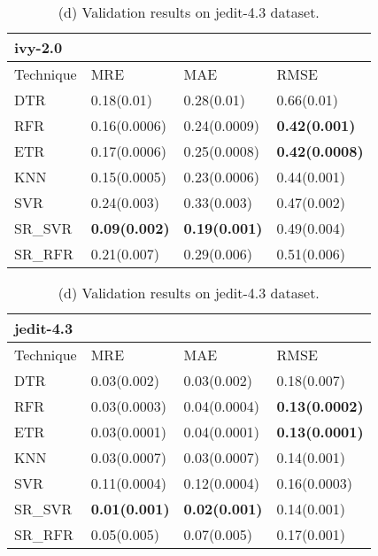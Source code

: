 \documentclass[]{article}
\begin{document}
	\begin{table}[h]
		\captionsetup[subtable]{labelformat=empty}
		\begin{adjustwidth}{-3.4cm}{}
			\begin{subtable}{9.5cm}
				\centering
				\caption{(c) Validation results on ivy-2.0 dataset.}
				\label{tab:ivy-wv}
				\begin{tabular}{llll}
					\hline
					ivy-2.0 &&&\\ \hline
					Technique & MRE & MAE & RMSE\\  \hline
					DTR & 0.18(0.01) & 0.28(0.01) & 0.66(0.01)\\ 
					RFR & 0.16(0.0006) & 0.24(0.0009) & \bfseries 0.42(0.001)\\ 
					ETR & 0.17(0.0006) & 0.25(0.0008) & \bfseries 0.42(0.0008)\\ 
					KNN & 0.15(0.0005) & 0.23(0.0006) & 0.44(0.001)\\ 
					SVR & 0.24(0.003) & 0.33(0.003) & 0.47(0.002)\\ 
					SR\_SVR & \bfseries 0.09(0.002) & \bfseries 0.19(0.001) & 0.49(0.004)\\
					SR\_RFR & 0.21(0.007) & 0.29(0.006) & 0.51(0.006)\\ \hline
				\end{tabular}
			\end{subtable}
			\begin{subtable}{9cm}
				\centering
				\caption{(d) Validation results on jedit-4.3 dataset.}
				\label{tab:jedit-wv}
				\begin{tabular}{llll}
					\hline
					jedit-4.3 &&&\\ \hline
					Technique & MRE & MAE & RMSE\\  \hline
					DTR & 0.03(0.002) & 0.03(0.002) & 0.18(0.007)\\ 
					RFR & 0.03(0.0003) & 0.04(0.0004) & \bfseries 0.13(0.0002)\\ 
					ETR & 0.03(0.0001) & 0.04(0.0001) & \bfseries 0.13(0.0001)\\ 
					KNN & 0.03(0.0007) & 0.03(0.0007) & 0.14(0.001)\\ 
					SVR & 0.11(0.0004) & 0.12(0.0004) & 0.16(0.0003)\\ 
					SR\_SVR & \bfseries 0.01(0.001) & \bfseries 0.02(0.001) & 0.14(0.001)\\
					SR\_RFR & 0.05(0.005) & 0.07(0.005) & 0.17(0.001)\\ \hline
				\end{tabular}
			\end{subtable} 
		\end{adjustwidth}
	\end{table}
\end{document}
